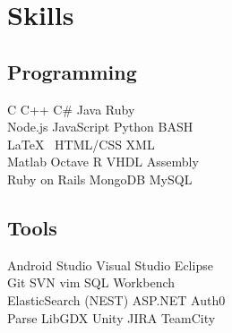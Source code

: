 \begin{minipage}[t]{0.33\textwidth} %


        \section{Skills}

        \subsection{Programming}

        C \textbullet{} C++ \textbullet{} C\# \textbullet{} Java \textbullet{} Ruby\\
        Node.js \textbullet{} JavaScript \textbullet{} Python \textbullet{} BASH \\
        \LaTeX\ \textbullet{} HTML/CSS \textbullet{} XML \\

        Matlab \textbullet{} Octave \textbullet{} R \textbullet{} VHDL \textbullet{} Assembly\\
        Ruby on Rails \textbullet{} MongoDB \textbullet{} MySQL\\

        \sectionspace %

        \subsection{Tools}
        Android Studio \textbullet{} Visual Studio \textbullet{} Eclipse \\
        Git \textbullet{} SVN \textbullet{} vim \textbullet{} SQL Workbench \\
        ElasticSearch (NEST)\textbullet{} ASP.NET \textbullet{} Auth0 \\
        Parse \textbullet{} LibGDX \textbullet{} Unity \textbullet{} JIRA \textbullet{} TeamCity\\





\end{minipage}
